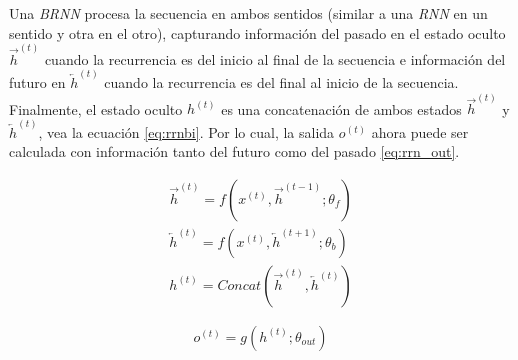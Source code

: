 Una \textit{BRNN} procesa la secuencia en ambos sentidos (similar a una \textit{RNN} en un
sentido y otra en el otro), capturando información del
pasado en el estado oculto $\overrightarrow{h}^{(t)}$ cuando la recurrencia es del inicio al final
de la secuencia e información del futuro en $\overleftarrow{h}^{(t)}$ cuando la recurrencia es del
final al inicio de la secuencia. Finalmente, el estado oculto $h^{(t)}$ es una concatenación de ambos
estados $\overrightarrow{h}^{(t)}$ y $\overleftarrow{h}^{(t)}$, vea la ecuación \ref{eq:rrnbi}.
Por lo cual, la salida $o^{(t)}$ ahora puede ser calculada con información tanto del futuro como del pasado
\ref{eq:rrn_out}.

\begin{equation}
\begin{split}
    \overrightarrow{h}^{(t)} = f(x^{(t)}, \overrightarrow{h}^{(t-1)}; \theta_f)\\
    \overleftarrow{h}^{(t)} = f(x^{(t)}, \overleftarrow{h}^{(t+1)}; \theta_b)\\
    h^{(t)} = Concat(\overrightarrow{h}^{(t)}, \overleftarrow{h}^{(t)})
\end{split}
\label{eq:rrnbi}
\end{equation}

\begin{equation}
        o^{(t)} = g(h^{(t)}; \theta_{out})
\label{eq:rrn_out}
\end{equation}
